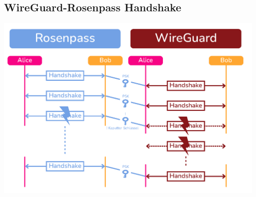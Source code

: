 \documentclass[sigconf]{acmart}
\begin{document}
\subsection{WireGuard-Rosenpass Handshake}\label{appendix:handshake}
\includegraphics[height=.35\textwidth]{assets/rosenpass-wireguard.png}

\end{document}
